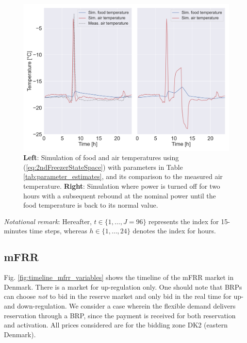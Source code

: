 \documentclass[11pt,a4paper]{article}
\begin{document}
\begin{figure}[!t]
    \centering
    \includegraphics[width=\columnwidth]{figures/2ndFreezerModelSimulation.png}
    \caption{ \textbf{Left}: Simulation of food and air temperatures using (\ref{eq:2ndFreezerStateSpace}) with parameters in Table \ref{tab:parameter_estimates}, and its comparison to the measured air temperature. \textbf{Right}: Simulation where power is turned off for two hours with a subsequent rebound at the nominal power until the food temperature is back to its normal value.}
    \label{fig:2ndFreezerModelSimulation}
\end{figure}

\textit{Notational remark}: Hereafter, $t \in \{1, \ldots, J=96\}$ represents the index for 15-minutes time steps, whereas $h\in \{1, \ldots, 24 \}$ denotes the index for hours.

\subsection{mFRR}\label{sec:mFRR}
%
Fig. \ref{fig:timeline_mfrr_variables} shows the timeline of the mFRR market in Denmark. There is a market for up-regulation only. One should note  that BRPs can choose \textit{not} to bid in the reserve market and  only bid in the real time for up- and down-regulation. We consider a case wherein the flexible demand delivers reservation through a BRP, since the payment is received for both reservation and activation. All prices considered are for the bidding zone DK2 (eastern Denmark).


%     
\end{document}
